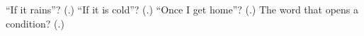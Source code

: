 \begin{tcolorbox}[breakable,colback=teal!4,colframe=teal!35!black,title={Before you move on}]
\textquotedblleft{}If it rains\textquotedblright{}? (\textbf{}.) \textquotedblleft{}If it is cold\textquotedblright{}? (\textbf{}.) \textquotedblleft{}Once I get home\textquotedblright{}? (\textbf{}.) The word that opens a condition? (\textbf{}.)
\end{tcolorbox}
